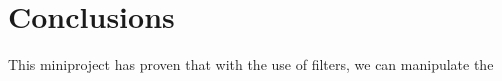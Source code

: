 
\section{Conclusions}
This miniproject has proven that with the use of filters, we can manipulate the 